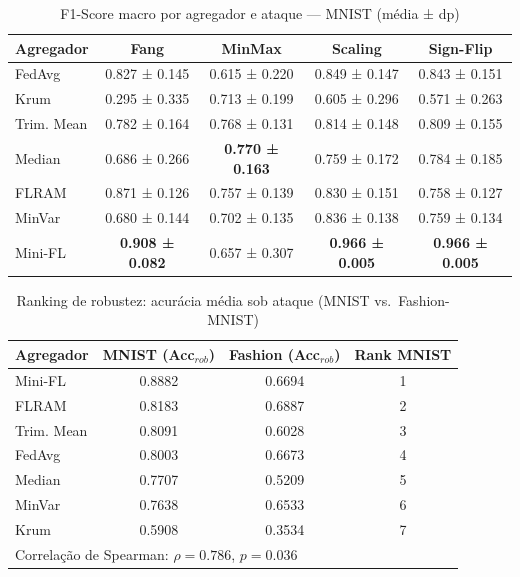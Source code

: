 \begin{table}[H]
\centering
\caption{F1-Score macro por agregador e ataque — MNIST (média ± dp)}
\label{tab:f1_mnist}
\footnotesize
\setlength{\tabcolsep}{3pt}
\begin{tabular}{@{}lcccc@{}}
\toprule
\textbf{Agregador} & \textbf{Fang} & \textbf{MinMax} & \textbf{Scaling} & \textbf{Sign-Flip} \\
\midrule
FedAvg & 0.827 ± 0.145 & 0.615 ± 0.220 & 0.849 ± 0.147 & 0.843 ± 0.151 \\
Krum & 0.295 ± 0.335 & 0.713 ± 0.199 & 0.605 ± 0.296 & 0.571 ± 0.263 \\
Trim. Mean & 0.782 ± 0.164 & 0.768 ± 0.131 & 0.814 ± 0.148 & 0.809 ± 0.155 \\
Median & 0.686 ± 0.266 & \textbf{0.770 ± 0.163} & 0.759 ± 0.172 & 0.784 ± 0.185 \\
FLRAM & 0.871 ± 0.126 & 0.757 ± 0.139 & 0.830 ± 0.151 & 0.758 ± 0.127 \\
MinVar & 0.680 ± 0.144 & 0.702 ± 0.135 & 0.836 ± 0.138 & 0.759 ± 0.134 \\
Mini-FL & \textbf{0.908 ± 0.082} & 0.657 ± 0.307 & \textbf{0.966 ± 0.005} & \textbf{0.966 ± 0.005} \\
\bottomrule
\end{tabular}
\end{table}
\begin{table}[H]
\centering
\caption{Ranking de robustez: acurácia média sob ataque (MNIST vs.~Fashion-MNIST)}
\label{tab:spearman_ranking}
\footnotesize
\setlength{\tabcolsep}{3pt}
\begin{tabular}{@{}lccc@{}}
\toprule
\textbf{Agregador} & \textbf{MNIST (Acc$_{rob}$)} & \textbf{Fashion (Acc$_{rob}$)} & \textbf{Rank MNIST} \\
\midrule
Mini-FL & 0.8882 & 0.6694 & 1 \\
FLRAM & 0.8183 & 0.6887 & 2 \\
Trim. Mean & 0.8091 & 0.6028 & 3 \\
FedAvg & 0.8003 & 0.6673 & 4 \\
Median & 0.7707 & 0.5209 & 5 \\
MinVar & 0.7638 & 0.6533 & 6 \\
Krum & 0.5908 & 0.3534 & 7 \\
\midrule
\multicolumn{4}{l}{Correlação de Spearman: $\rho = 0.786$, $p = 0.036$} \\
\bottomrule
\end{tabular}
\end{table}
